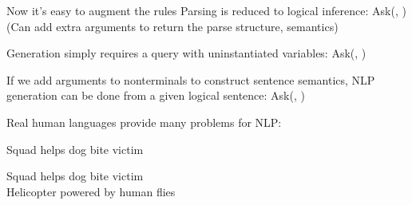 \documentclass{article}
\begin{document}
\begin{huge}

Now it's easy to augment the rules
Parsing is reduced to logical inference:\al
  {\sc Ask}(, )\\
(Can add extra arguments to return the parse structure, semantics)

Generation simply requires a query with uninstantiated variables:\al
  {\sc Ask}(, )

If we add arguments to nonterminals to construct sentence semantics,
NLP generation can be done from a given logical sentence:\al
  {\sc Ask}(, )






Real human languages provide many problems for NLP:

\blob {}

\blob {}

\blob {}

\blob {}

\blob {}

\blob {}

\blob {}

\blob {}



Squad helps dog bite victim 


Squad helps dog bite victim \\
Helicopter powered by human flies


\end{huge}
\end{document}
